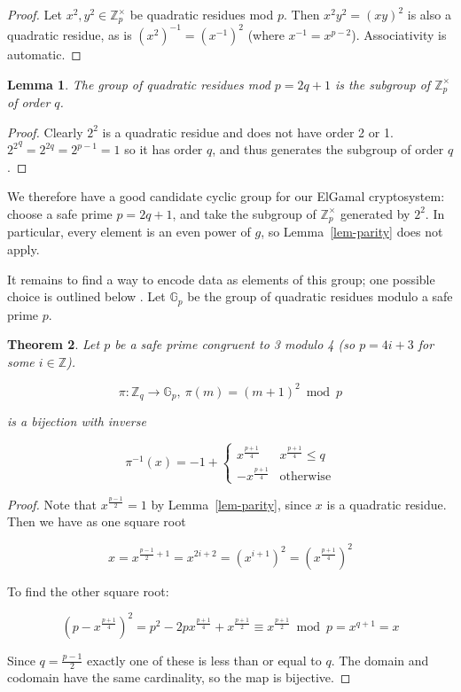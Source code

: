 \documentclass[11pt,twoside,a4paper]{article}
\newtheorem{theorem}{Theorem}[section]
\newtheorem{lemma}[theorem]{Lemma}
\theoremstyle{definition}
\begin{document}
\begin{proof}
    Let \(x^2,y^2\in\mathbb{Z}^\times_p\) be quadratic residues mod \(p\). Then \(x^2y^2=(xy)^2\) is also a quadratic residue, as is \((x^2)^{-1}=(x^{-1})^2\) (where \(x^{-1}=x^{p-2}\)). Associativity is automatic.
\end{proof}
\begin{lemma}
    The group of quadratic residues mod \(p=2q+1\) is the subgroup of \(\mathbb{Z}^\times_p\) of order \(q\).
\end{lemma}
\begin{proof}
    Clearly \(2^2\) is a quadratic residue and does not have order 2 or 1. \({2^2}^q=2^{2q}=2^{p-1}=1\) so it has order \(q\), and thus generates the subgroup of order \(q\).
\end{proof}
We therefore have a good candidate cyclic group for our ElGamal cryptosystem: choose a safe prime \(p=2q+1\), and take the subgroup of \(\mathbb{Z}^\times_p\) generated by \(2^2\). In particular, every element is an even power of \(g\), so Lemma~\ref{lem-parity} does not apply.

It remains to find a way to encode data as elements of this group; one possible choice is outlined below \cite{katz2014introduction}. Let \(\mathbb{G}_p\) be the group of quadratic residues modulo a safe prime \(p\).
\begin{theorem}
    Let \(p\) be a safe prime congruent to 3 modulo 4 (so \(p=4i+3\) for some \(i\in\mathbb{Z}\)).

    \[\pi:\mathbb{Z}_q\rightarrow\mathbb{G}_p,\ \pi(m)=(m+1)^2\bmod p\]

    is a bijection with inverse

    \[\pi^{-1}(x)=-1+\begin{cases}
        x^\frac{p+1}{4} & x^\frac{p+1}{4}\leq q\\
        -x^\frac{p+1}{4}&\text{otherwise}
    \end{cases}\]

\end{theorem}
\begin{proof}
    Note that \(x^\frac{p-1}{2}=1\) by Lemma~\ref{lem-parity}, since \(x\) is a quadratic residue. Then we have as one square root

    \[x=x^{\frac{p-1}{2}+1}=x^{2i+2}=(x^{i+1})^2=\left(x^\frac{p+1}{4}\right)^2\]

    To find the other square root:

    \[\left(p-x^\frac{p+1}{4}\right)^2=p^2-2px^\frac{p+1}{4}+x^\frac{p+1}{2}\equiv x^\frac{p+1}{2}\bmod p=x^{q+1}=x\]

    Since \(q=\frac{p-1}{2}\) exactly one of these is less than or equal to \(q\). The domain and codomain have the same cardinality, so the map is bijective.



\end{proof}
\end{document}
